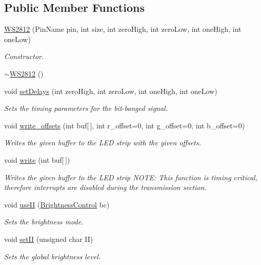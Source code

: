 \subsection*{Public Member Functions}
\begin{DoxyCompactItemize}
\item 
\hyperlink{class_w_s2812_a397fb1e75594024884cb4365d3c725cd}{W\+S2812} (Pin\+Name pin, int size, int zero\+High, int zero\+Low, int one\+High, int one\+Low)
\begin{DoxyCompactList}\small\item\em Constructor. \end{DoxyCompactList}\item 
\hyperlink{class_w_s2812_a58973dedd9cbc5c3fd3397f07f9a720f}{$\sim$\+W\+S2812} ()
\item 
void \hyperlink{class_w_s2812_a7e1370e6fbb56daa68f1146e7b58d9ec}{set\+Delays} (int zero\+High, int zero\+Low, int one\+High, int one\+Low)
\begin{DoxyCompactList}\small\item\em Sets the timing parameters for the bit-\/banged signal. \end{DoxyCompactList}\item 
void \hyperlink{class_w_s2812_a578fd0b278445bd6f84e260a69b18a68}{write\+\_\+offsets} (int buf\mbox{[}$\,$\mbox{]}, int r\+\_\+offset=0, int g\+\_\+offset=0, int b\+\_\+offset=0)
\begin{DoxyCompactList}\small\item\em Writes the given buffer to the L\+ED strip with the given offsets. \end{DoxyCompactList}\item 
void \hyperlink{class_w_s2812_ab85d6a78bc51929dac48db05f6bc68d4}{write} (int buf\mbox{[}$\,$\mbox{]})
\begin{DoxyCompactList}\small\item\em Writes the given buffer to the L\+ED strip N\+O\+TE\+: This function is timing critical, therefore interrupts are disabled during the transmission section. \end{DoxyCompactList}\item 
void \hyperlink{class_w_s2812_acb221ea7ba9cfb40a43b7778f0dffa5d}{use\+II} (\hyperlink{class_w_s2812_a14186f70863bf4f3a35b2cc21b15642d}{Brightness\+Control} bc)
\begin{DoxyCompactList}\small\item\em Sets the brightness mode. \end{DoxyCompactList}\item 
void \hyperlink{class_w_s2812_a8b6491617f9beb271d6d5c56ba384fb6}{set\+II} (unsigned char II)
\begin{DoxyCompactList}\small\item\em Sets the global brightness level. \end{DoxyCompactList}\end{DoxyCompactItemize}
